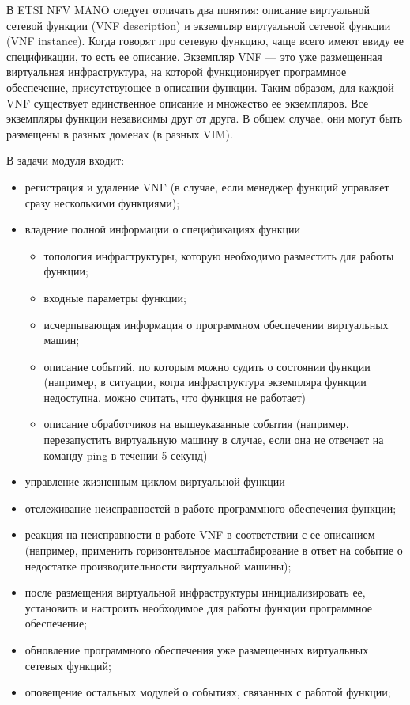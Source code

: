 \documentclass[oneside,final,14pt,a4paper]{extreport}
\begin{document}
В ETSI NFV MANO следует отличать два понятия: описание виртуальной сетевой функции (VNF description) и экземпляр виртуальной сетевой функции (VNF instance). Когда говорят про сетевую функцию, чаще всего имеют ввиду ее спецификации, то есть ее описание. Экземпляр VNF --- это уже размещенная виртуальная инфраструктура, на которой функционирует программное обеспечение, присутствующее в описании функции. Таким образом, для каждой VNF существует единственное описание и множество ее экземпляров. Все экземпляры функции независимы друг от друга. В общем случае, они могут быть размещены в разных доменах (в разных VIM).

В задачи модуля входит:

\begin{itemize}
	\item регистрация и удаление VNF (в случае, если менеджер функций управляет сразу несколькими функциями);
	\item владение полной информации о спецификациях функции
	\begin{itemize}
		\item топология инфраструктуры, которую необходимо разместить для работы функции;
		\item входные параметры функции;
		\item исчерпывающая информация о программном обеспечении виртуальных машин;
		\item описание событий, по которым можно судить о состоянии функции (например, в ситуации, когда инфраструктура экземпляра функции недоступна, можно считать, что функция не работает)
		\item описание обработчиков на вышеуказанные события (например, перезапустить виртуальную машину в случае, если она не отвечает на команду ping в течении 5 секунд)
	\end{itemize}
	\item управление жизненным циклом виртуальной функции
	\item отслеживание неисправностей в работе программного обеспечения функции;
	\item реакция на неисправности в работе VNF в соответствии с ее описанием (например, применить горизонтальное масштабирование в ответ на событие о недостатке производительности виртуальной машины);
	\item после размещения виртуальной инфраструктуры инициализировать ее, установить и настроить необходимое для работы функции программное обеспечение;
	\item обновление программного обеспечения уже размещенных виртуальных сетевых функций;
	\item оповещение остальных модулей о событиях, связанных с работой функции;
\end{itemize}
\end{document}
